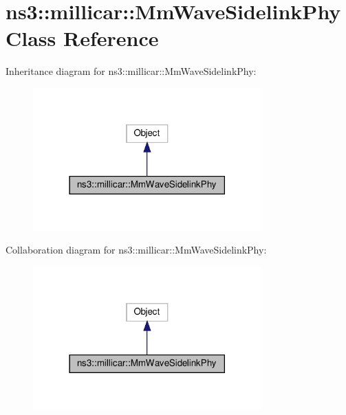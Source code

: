 \hypertarget{classns3_1_1millicar_1_1MmWaveSidelinkPhy}{}\section{ns3\+:\+:millicar\+:\+:Mm\+Wave\+Sidelink\+Phy Class Reference}
\label{classns3_1_1millicar_1_1MmWaveSidelinkPhy}


Inheritance diagram for ns3\+:\+:millicar\+:\+:Mm\+Wave\+Sidelink\+Phy\+:\nopagebreak
\begin{figure}[H]
\begin{center}
\leavevmode
\includegraphics[width=249pt]{classns3_1_1millicar_1_1MmWaveSidelinkPhy__inherit__graph}
\end{center}
\end{figure}


Collaboration diagram for ns3\+:\+:millicar\+:\+:Mm\+Wave\+Sidelink\+Phy\+:\nopagebreak
\begin{figure}[H]
\begin{center}
\leavevmode
\includegraphics[width=249pt]{classns3_1_1millicar_1_1MmWaveSidelinkPhy__coll__graph}
\end{center}
\end{figure}
